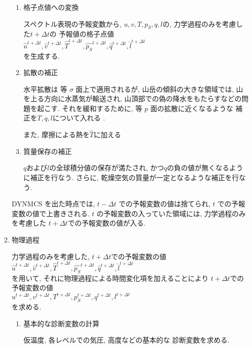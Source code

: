 \begin{enumerate}
\begin{enumerate}
\item 格子点値への変換 

スペクトル表現の予報変数から,
$u, v, T, p_S, q, l$の,
力学過程のみを考慮した$t+\Delta t$の
予報値の格子点値 \\
$\hat{u}^{t+\Delta t}, \hat{v}^{t+\Delta t}, 
\hat{T}^{t+\Delta t}, \hat{p_S}^{t+\Delta t}, 
\hat{q}^{t+\Delta t}, \hat{l}^{t+\Delta t}$  \\
を生成する.

\item 拡散の補正 

水平拡散は 等 $\sigma$ 面上で適用されるが,
山岳の傾斜の大きな領域では, 山を上る方向に水蒸気が輸送され,
山頂部での偽の降水をもたらすなどの問題を起こす.
それを緩和するために, 等 $p$ 面の拡散に近くなるような
補正を$T,q,l$について入れる . 

また, 摩擦による熱を$\hat{T}$に加える 

\item 質量保存の補正 

$q$および$l$の全球積分値の保存が満たされ,
かつ$q$の負の値が無くなるように補正を行なう.
さらに, 乾燥空気の質量が一定となるような補正を行なう.

\end{enumerate}

DYNMCS を出た時点では,
$t-\Delta t$ での予報変数の値は捨てられ,
$t$ での予報変数の値で上書きされる.
$t$ の予報変数の入っていた領域には,
力学過程のみを考慮した 
$t+\Delta t$での予報変数の値が入る.

\item 物理過程 

力学過程のみを考慮した, $t+\Delta t$での予報変数の値 \\
$\hat{u}^{t+\Delta t}, \hat{v}^{t+\Delta t}, 
\hat{T}^{t+\Delta t}, \hat{p_S}^{t+\Delta t}, 
\hat{q}^{t+\Delta t}, \hat{l}^{t+\Delta t}$  \\
を用いて, それに物理過程による時間変化項を加えることにより
$t+\Delta t$での予報変数の値 \\
$u^{t+\Delta t}, v^{t+\Delta t}, 
T^{t+\Delta t}, p_S^{t+\Delta t}, 
q^{t+\Delta t}, l^{t+\Delta t}$  \\
を求める.

\begin{enumerate}
\item 基本的な診断変数の計算 

仮温度, 各レベルでの気圧, 高度などの基本的な
診断変数を求める.


\end{enumerate}
\end{enumerate}
